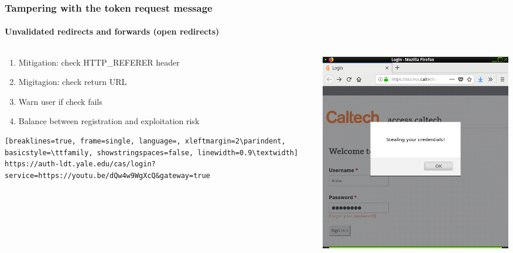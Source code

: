 \documentclass[handout, aspectratio=169, notes=hide]{beamer}
\begin{document}

\begin{frame}[fragile]
\frametitle{Tampering with the token request message}
\framesubtitle{Unvalidated redirects and forwards (open redirects)}
\setlength{\parskip}{1.0em}
\begin{columns}[T]
\begin{column}[T]{0.7\textwidth}	
\setlength{\parskip}{1.0em}

\begin{enumerate}
\setlength{\parskip}{1.0em}
\item Mitigation: check HTTP\_REFERER header
\item Migitagion: check return URL
\item Warn user if check fails
\item Balance between registration and exploitation risk
\end{enumerate}
\begin{lstlisting}[breaklines=true, frame=single, language=, xleftmargin=2\parindent, basicstyle=\ttfamily, showstringspaces=false, linewidth=0.9\textwidth]
https://auth-ldt.yale.edu/cas/login?service=https://youtu.be/dQw4w9WgXcQ&gateway=true
\end{lstlisting}
\end{column}

\begin{column}[T]{0.3\textwidth}
\vspace{0.5cm}
\includegraphics[width=1.2\textwidth,right]{caltech_alice}
\end{column}
\end{columns}
\end{frame}
\note{
}
\end{document}
